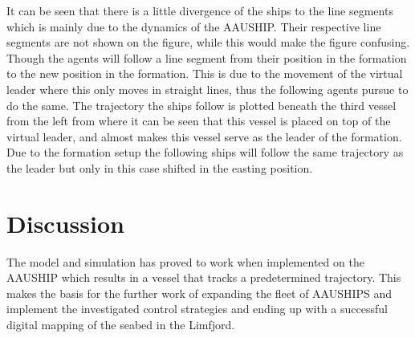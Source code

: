 \documentclass[conference]{IEEEtran}
\begin{document}
It can be seen that there is a little divergence of the ships to the line segments which is mainly due to the dynamics of the AAUSHIP. Their respective line segments are not shown on the figure, while this would make the figure confusing. Though the agents will follow a line segment from their position in the formation to the new position in the formation. This is due to the movement of the virtual leader where this only moves in straight lines, thus the following agents pursue to do the same. The trajectory the ships follow is plotted beneath the third vessel from the left from where it can be seen that this vessel is placed on top of the virtual leader, and almost makes this vessel serve as the leader of the formation. Due to the formation setup the following ships will follow the same trajectory as the leader but only in this case shifted in the easting position.

\section{Discussion}

The model and simulation has proved to work when implemented on the AAUSHIP which results in a vessel that tracks a predetermined trajectory. This makes the basis for the further work of expanding the fleet of AAUSHIPS and implement the investigated control strategies and ending up with a successful digital mapping of the seabed in the Limfjord.



 

\end{document}
